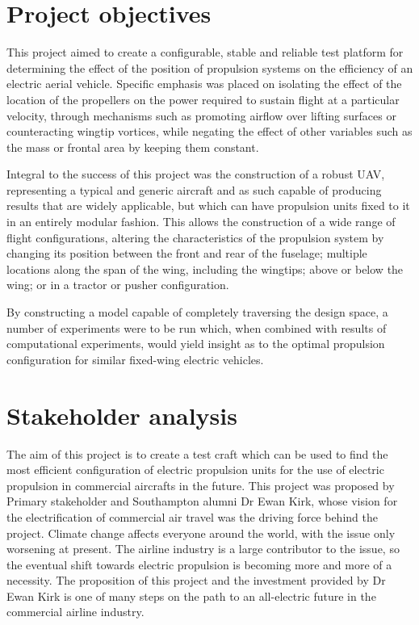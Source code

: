 \documentclass[../../main.tex]{subfiles}
\begin{document}

\section{Project objectives} \label{section:design-brief:project-objectives}

This project aimed to create a configurable, stable and reliable test platform for determining the effect of the position of propulsion systems on the efficiency of an electric aerial vehicle.
Specific emphasis was placed on isolating the effect of the location of the propellers on the power required to sustain flight at a particular velocity, through mechanisms such as promoting airflow over lifting surfaces or counteracting wingtip vortices, while negating the effect of other variables such as the mass or frontal area by keeping them constant. 

Integral to the success of this project was the construction of a robust UAV, representing a typical and generic aircraft and as such capable of producing results that are widely applicable, but which can have propulsion units fixed to it in an entirely modular fashion.
This allows the construction of a wide range of flight configurations, altering the characteristics of the propulsion system by changing its position between the front and rear of the fuselage; multiple locations along the span of the wing, including the wingtips; above or below the wing; or in a tractor or pusher configuration. 

By constructing a model capable of completely traversing the design space, a number of experiments were to be run which, when combined with results of computational experiments, would yield insight as to the optimal propulsion configuration for similar fixed-wing electric vehicles. 

\section{Stakeholder analysis} \label{section:design-brief:stakeholder-analysis}


The aim of this project is to create a test craft which can be used to find the most efficient configuration of electric propulsion units for the use of electric propulsion in commercial aircrafts in the future.
This project was proposed by Primary stakeholder and Southampton alumni Dr Ewan Kirk, whose vision for the electrification of commercial air travel was the driving force behind the project.
Climate change affects everyone around the world, with the issue only worsening at present.
The airline industry is a large contributor to the issue, so the eventual shift towards electric propulsion is becoming more and more of a necessity.
The proposition of this project and the investment provided by Dr Ewan Kirk is one of many steps on the path to an all-electric future in the commercial airline industry.  
\end{document}

